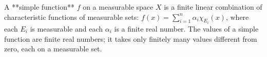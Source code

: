 A **simple function** $f$ on a measurable space $X$ is a finite linear combination of characteristic functions of measurable sets: $f(x) = \sum_{i=1}^{n} \alpha_i \chi_{E_i}(x)$, where each $E_i$ is measurable and each $\alpha_i$ is a finite real number. The values of a simple function are finite real numbers; it takes only finitely many values different from zero, each on a measurable set.
